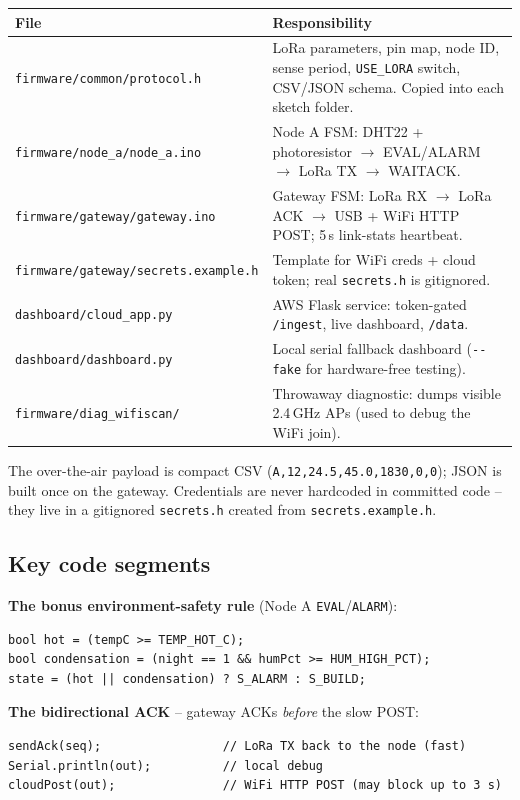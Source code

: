 \documentclass[11pt,a4paper]{article}
\begin{document}
\begin{longtable}{@{}lp{10.2cm}@{}}
\toprule
\textbf{File} & \textbf{Responsibility}\\
\midrule\endhead
\texttt{firmware/common/protocol.h} & LoRa parameters, pin map, node ID, sense period, \texttt{USE\_LORA} switch, CSV/JSON schema. Copied into each sketch folder.\\
\texttt{firmware/node\_a/node\_a.ino} & Node A FSM: DHT22 + photoresistor $\rightarrow$ EVAL/ALARM $\rightarrow$ LoRa TX $\rightarrow$ WAITACK.\\
\texttt{firmware/gateway/gateway.ino} & Gateway FSM: LoRa RX $\rightarrow$ LoRa ACK $\rightarrow$ USB + WiFi HTTP POST; 5\,s link-stats heartbeat.\\
\texttt{firmware/gateway/secrets.example.h} & Template for WiFi creds + cloud token; real \texttt{secrets.h} is gitignored.\\
\texttt{dashboard/cloud\_app.py} & AWS Flask service: token-gated \texttt{/ingest}, live dashboard, \texttt{/data}.\\
\texttt{dashboard/dashboard.py} & Local serial fallback dashboard (\texttt{-{}-fake} for hardware-free testing).\\
\texttt{firmware/diag\_wifiscan/} & Throwaway diagnostic: dumps visible 2.4\,GHz APs (used to debug the WiFi join).\\
\bottomrule
\end{longtable}

The over-the-air payload is compact CSV
(\texttt{A,12,24.5,45.0,1830,0,0}); JSON is built once on the gateway.
Credentials are never hardcoded in committed code -- they live in a
gitignored \texttt{secrets.h} created from \texttt{secrets.example.h}.

\subsection{Key code segments}

\textbf{The bonus environment-safety rule} (Node A \texttt{EVAL}/\texttt{ALARM}):
\begin{lstlisting}
bool hot = (tempC >= TEMP_HOT_C);
bool condensation = (night == 1 && humPct >= HUM_HIGH_PCT);
state = (hot || condensation) ? S_ALARM : S_BUILD;
\end{lstlisting}

\textbf{The bidirectional ACK} -- gateway ACKs \emph{before} the slow POST:
\begin{lstlisting}
sendAck(seq);                 // LoRa TX back to the node (fast)
Serial.println(out);          // local debug
cloudPost(out);               // WiFi HTTP POST (may block up to 3 s)
\end{lstlisting}
\end{document}
